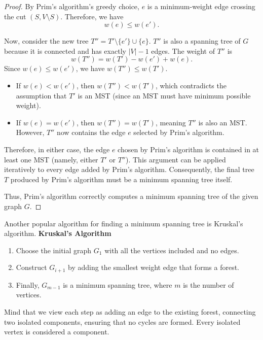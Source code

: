 \documentclass[oneside]{book}
\begin{document}
\begin{proof}
By Prim's algorithm's greedy choice, $e$ is a minimum-weight edge crossing the cut $(S, V \setminus S)$. Therefore, we have
\[
w(e) \leq w(e').
\]

Now, consider the new tree $T'' = T' \setminus \{e'\} \cup \{e\}$. $T''$ is also a spanning tree of $G$ because it is connected and has exactly $|V|-1$ edges. The weight of $T''$ is
\[
w(T'') = w(T') - w(e') + w(e).
\]
Since $w(e) \leq w(e')$, we have $w(T'') \leq w(T')$.

\begin{itemize}
    \item If $w(e) < w(e')$, then $w(T'') < w(T')$, which contradicts the assumption that $T'$ is an MST (since an MST must have minimum possible weight).
    \item If $w(e) = w(e')$, then $w(T'') = w(T')$, meaning $T''$ is also an MST. However, $T''$ now contains the edge $e$ selected by Prim's algorithm.
\end{itemize}

Therefore, in either case, the edge $e$ chosen by Prim's algorithm is contained in at least one MST (namely, either $T'$ or $T''$). This argument can be applied iteratively to every edge added by Prim's algorithm. Consequently, the final tree $T$ produced by Prim's algorithm must be a minimum spanning tree itself.

Thus, Prim's algorithm correctly computes a minimum spanning tree of the given graph $G$.

\end{proof}

Another popular algorithm for finding a minimum spanning tree is Kruskal's algorithm.
\textbf{Kruskal's Algorithm}
\begin{enumerate}
    \item Choose the initial graph $G_1$ with all the vertices included and no edges.
    \item Construct $G_{i+1}$ by adding the smallest weight edge that forms a forest.
    \item Finally, $G_{m-1}$ is a minimum spanning tree, where $m$ is the number of vertices.
\end{enumerate}

Mind that we view each step as adding an edge to the existing forest, connecting two isolated components, ensuring that no cycles are formed. Every isolated vertex is considered a component.
\end{document}
